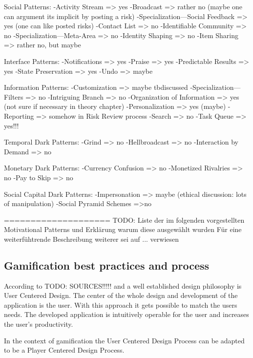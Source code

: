 Social Patterns:
-Activity Stream => yes
-Broadcast => rather no (maybe one can argument its implicit by posting a risk)
-Specialization—Social Feedback => yes (one can like posted risks)
-Contact List => no
-Identifiable Community => no
-Specialization—Meta-Area => no
-Identity Shaping => no
-Item Sharing => rather no, but maybe

Interface Patterns:
-Notifications => yes
-Praise => yes
-Predictable Results => yes
-State Preservation => yes
-Undo => maybe

Information Patterns:
-Customization => maybe tbdiscussed
-Specialization—Filters => no
-Intriguing Branch => no
-Organization of Information => yes (not sure if necessary in theory chapter)
-Personalization => yes (maybe)
-Reporting => somehow in Risk Review process
-Search => no
-Task Queue => yes!!!

Temporal Dark Patterns:
-Grind => no
-Hellbroadcast => no
-Interaction by Demand => no

Monetary Dark Patterns:
-Currency Confusion => no
-Monetized Rivalries => no
-Pay to Skip => no

Social Capital Dark Patterns:
-Impersonation => maybe (ethical discussion: lots of manipulation)
-Social Pyramid Schemes =>no

====================\newline
TODO: Liste der im folgenden vorgestellten Motivational Patterns und Erklärung warum diese ausgewählt wurden
Für eine weiterfühtrende Beschreibung weiterer sei auf ... verwiesen

\subsection{Gamification best practices and process}
\label{sec:theoryBd}

According to TODO: SOURCES!!!!! and \cite[p. 27, 28]{inproceedings} a well established design philosophy is User Centered Design. The center of the whole design and development of the application is the user. With this approach it gets possible to match the users needs. The developed application is intuitively operable for the user and increases the user's productivity.

In the context of gamification the User Centered Design Process can be adapted to be a Player Centered Design Process.  

